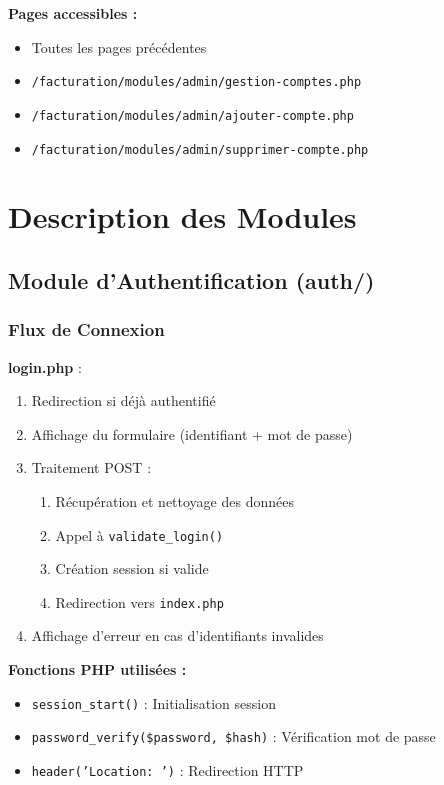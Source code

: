 \documentclass[12pt,a4paper]{report}
\begin{document}
\textbf{Pages accessibles :}
\begin{itemize}
    \item Toutes les pages précédentes
    \item \texttt{/facturation/modules/admin/gestion-comptes.php}
    \item \texttt{/facturation/modules/admin/ajouter-compte.php}
    \item \texttt{/facturation/modules/admin/supprimer-compte.php}
\end{itemize}

\chapter{Description des Modules}

\section{Module d'Authentification (auth/)}

\subsection{Flux de Connexion}

\textbf{login.php} :
\begin{enumerate}
    \item Redirection si déjà authentifié
    \item Affichage du formulaire (identifiant + mot de passe)
    \item Traitement POST :
        \begin{enumerate}
            \item Récupération et nettoyage des données
            \item Appel à \texttt{validate\_login()}
            \item Création session si valide
            \item Redirection vers \texttt{index.php}
        \end{enumerate}
    \item Affichage d'erreur en cas d'identifiants invalides
\end{enumerate}

\textbf{Fonctions PHP utilisées :}
\begin{itemize}
    \item \texttt{session\_start()} : Initialisation session
    \item \texttt{password\_verify(\$password, \$hash)} : Vérification mot de passe
    \item \texttt{header('Location: ')} : Redirection HTTP
\end{itemize}
\end{document}
